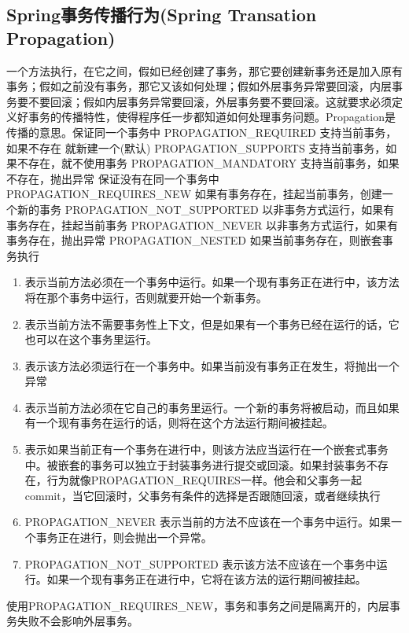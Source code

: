 \documentclass[../../../interview-questions.tex]{subfiles}
\begin{document}
\subsection{Spring事务传播行为(Spring Transation Propagation)}

一个方法执行，在它之间，假如已经创建了事务，那它要创建新事务还是加入原有事务；假如之前没有事务，那它又该如何处理；假如外层事务异常要回滚，内层事务要不要回滚；假如内层事务异常要回滚，外层事务要不要回滚。这就要求必须定义好事务的传播特性，使得程序任一步都知道如何处理事务问题。Propagation是传播的意思。保证同一个事务中
PROPAGATION\_REQUIRED 支持当前事务，如果不存在 就新建一个(默认)
PROPAGATION\_SUPPORTS 支持当前事务，如果不存在，就不使用事务
PROPAGATION\_MANDATORY 支持当前事务，如果不存在，抛出异常
保证没有在同一个事务中
PROPAGATION\_REQUIRES\_NEW 如果有事务存在，挂起当前事务，创建一个新的事务
PROPAGATION\_NOT\_SUPPORTED 以非事务方式运行，如果有事务存在，挂起当前事务
PROPAGATION\_NEVER 以非事务方式运行，如果有事务存在，抛出异常
PROPAGATION\_NESTED 如果当前事务存在，则嵌套事务执行

\begin{enumerate}
\item {\color{blue}{PROPAGATION\_REQUIRES}}	表示当前方法必须在一个事务中运行。如果一个现有事务正在进行中，该方法将在那个事务中运行，否则就要开始一个新事务。
\item{\color{blue}{PROPAGATION\_SUPPORTS}}	表示当前方法不需要事务性上下文，但是如果有一个事务已经在运行的话，它也可以在这个事务里运行。
\item{\color{blue}{PROPAGATION\_MANDATORY}}	表示该方法必须运行在一个事务中。如果当前没有事务正在发生，将抛出一个异常

\item{\color{blue}{PROPAGATION\_REQUIRES\_NEW}	}表示当前方法必须在它自己的事务里运行。一个新的事务将被启动，而且如果有一个现有事务在运行的话，则将在这个方法运行期间被挂起。
\item{\color{blue}{PROPAGATION\_NESTED}	}表示如果当前正有一个事务在进行中，则该方法应当运行在一个嵌套式事务中。被嵌套的事务可以独立于封装事务进行提交或回滚。如果封装事务不存在，行为就像PROPAGATION\_REQUIRES一样。他会和父事务一起commit，当它回滚时，父事务有条件的选择是否跟随回滚，或者继续执行
\item{PROPAGATION\_NEVER	表示当前的方法不应该在一个事务中运行。如果一个事务正在进行，则会抛出一个异常。}
\item{PROPAGATION\_NOT\_SUPPORTED	表示该方法不应该在一个事务中运行。如果一个现有事务正在进行中，它将在该方法的运行期间被挂起。}
\end{enumerate}

使用PROPAGATION\_REQUIRES\_NEW，事务和事务之间是隔离开的，内层事务失败不会影响外层事务。
\end{document}
